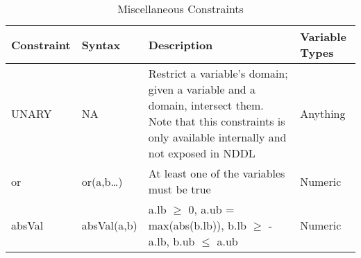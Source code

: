 \begin{table*}[ht]
  \centering
  \renewcommand{\arraystretch}{1.0}%
  \begin{tabular}{|l|l|p{9.5cm}|p{3cm}|}
    \hline
    \textbf{Constraint}& \textbf{Syntax}& \textbf{Description}& \textbf{Variable Types}\\
    \hline
    UNARY& NA& Restrict a variable's domain; given a variable and a domain, intersect them. Note that this constraints is only available internally and not exposed in NDDL& Anything\\
    \hline
    or& or(a,b\ldots)& At least one of the variables must be true& Numeric\\
    \hline
    absVal& absVal(a,b)& a.lb $\geq$ 0, a.ub = max(abs(b.lb)), b.lb $\geq$ -a.lb, b.ub $\leq$ a.ub& Numeric\\
    \hline
  \end{tabular}
 \caption{\small Miscellaneous Constraints}
  \label{tab:misc}
\end{table*}

